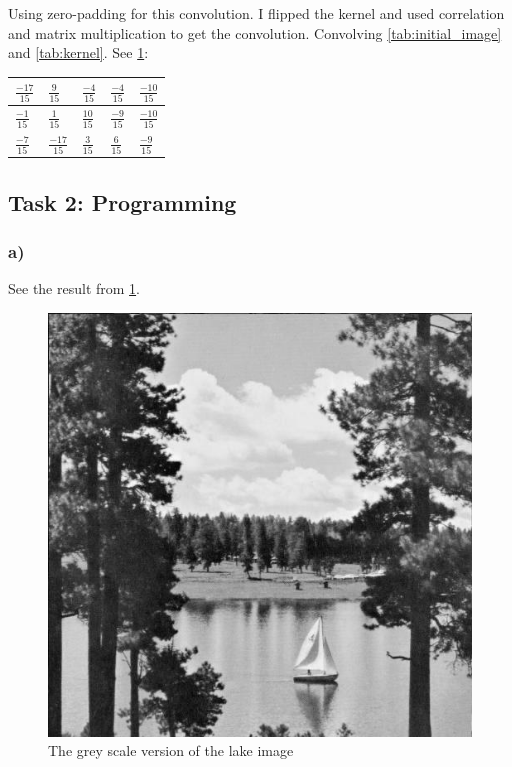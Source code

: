 Using zero-padding for this convolution. I flipped the kernel and used correlation and matrix multiplication to get the convolution. Convolving \cref{tab:initial_image} and \cref{tab:kernel}. See \cref{tab:kernel_convolution}: 
\begin{table}[]
    \label{tab:kernel_convolution}
    \begin{tabular}{|l|l|l|l|l|}
        \hline
        $\frac{-17}{15}$ & $\frac{9  }{15}$ & $\frac{-4}{15}$ & $\frac{-4}{15}$ & $\frac{-10}{15}$ \\ \hline
        $\frac{-1 }{15}$ & $\frac{1  }{15}$ & $\frac{10}{15}$ & $\frac{-9}{15}$ & $\frac{-10}{15}$ \\ \hline 
        $\frac{-7 }{15}$ & $\frac{-17}{15}$ & $\frac{3 }{15}$ & $\frac{6 }{15}$ & $\frac{-9}{15} $ \\ \hline
    \end{tabular} 
\end{table}

\newpage
\subsection{Task 2: Programming}
\subsubsection*{a)}
See the result from \cref{fig:greyscale}. 
\begin{figure}[]
    \centering
    \includegraphics[width=1.00\textwidth]{figures/image_processed/lake_greyscale.jpg}
    \caption{The grey scale version of the lake image}
    \label{fig:greyscale}
\end{figure}

